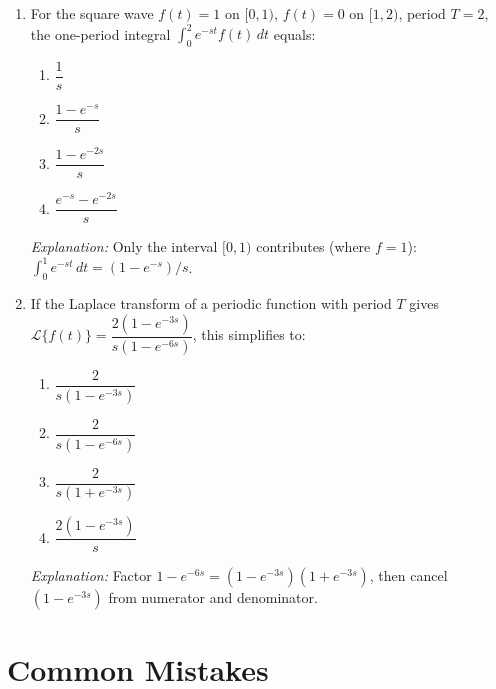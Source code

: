 \documentclass[12pt,a4paper]{article}
\begin{document}
\begin{enumerate}[label=\textbf{MCQ \arabic*.}, leftmargin=*]
\item For the square wave $f(t) = 1$ on $[0,1)$, $f(t) = 0$ on $[1,2)$,
period $T=2$, the one-period integral $\int_0^2 e^{-st}f(t)\,dt$ equals:

\begin{enumerate}[label=(\alph*), noitemsep]
  \item $\dfrac{1}{s}$
  \item \textbf{$\dfrac{1-e^{-s}}{s}$}
  \item $\dfrac{1-e^{-2s}}{s}$
  \item $\dfrac{e^{-s}-e^{-2s}}{s}$
\end{enumerate}
\textit{Explanation:} Only the interval $[0,1)$ contributes (where $f=1$):
$\int_0^1 e^{-st}\,dt = (1-e^{-s})/s$.

\item If the Laplace transform of a periodic function with period $T$ gives
$\mathcal{L}\{f(t)\} = \dfrac{2(1-e^{-3s})}{s(1-e^{-6s})}$, this simplifies
to:

\begin{enumerate}[label=(\alph*), noitemsep]
  \item $\dfrac{2}{s(1-e^{-3s})}$
  \item $\dfrac{2}{s(1-e^{-6s})}$
  \item \textbf{$\dfrac{2}{s(1+e^{-3s})}$}
  \item $\dfrac{2(1-e^{-3s})}{s}$
\end{enumerate}
\textit{Explanation:} Factor $1-e^{-6s} = (1-e^{-3s})(1+e^{-3s})$, then cancel
$(1-e^{-3s})$ from numerator and denominator.

\end{enumerate}

\section{Common Mistakes}
\end{document}
